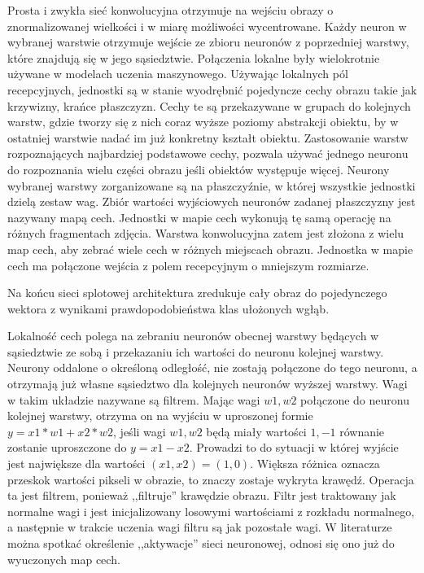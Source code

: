 \documentclass[12pt,a4paper,twoside,titlepage,openright]{book}
\begin{document}
Prosta i zwykła sieć konwolucyjna otrzymuje na wejściu obrazy o znormalizowanej wielkości i w miarę możliwości wycentrowane. Każdy neuron w wybranej warstwie otrzymuje wejście ze zbioru neuronów z poprzedniej warstwy, które znajdują się w jego sąsiedztwie. Połączenia lokalne były wielokrotnie używane w modelach uczenia maszynowego. Używając lokalnych pól recepcyjnych, jednostki są w stanie wyodrębnić pojedyncze cechy obrazu takie jak krzywizny, krańce płaszczyzn. Cechy te są przekazywane w grupach do kolejnych warstw, gdzie tworzy się z nich coraz wyższe poziomy abstrakcji obiektu, by w ostatniej warstwie nadać im już konkretny kształt obiektu. Zastosowanie warstw rozpoznających najbardziej podstawowe cechy, pozwala używać jednego neuronu do rozpoznania wielu części obrazu jeśli obiektów występuje więcej. Neurony wybranej warstwy zorganizowane są na płaszczyźnie, w której wszystkie jednostki dzielą zestaw wag. Zbiór wartości wyjściowych neuronów zadanej płaszczyzny jest nazywany mapą cech. Jednostki w mapie cech wykonują tę samą operację na różnych fragmentach zdjęcia. Warstwa konwolucyjna zatem jest złożona z wielu map cech, aby zebrać wiele cech w różnych miejscach obrazu. Jednostka w mapie cech ma połączone wejścia z polem recepcyjnym o mniejszym rozmiarze.

Na końcu sieci splotowej architektura zredukuje cały obraz do pojedynczego wektora z wynikami prawdopodobieństwa klas ułożonych wgłąb.

Lokalność cech polega na zebraniu neuronów obecnej warstwy będących w sąsiedztwie ze sobą i przekazaniu ich wartości do neuronu kolejnej warstwy. Neurony oddalone o określoną odległość, nie zostają połączone do tego neuronu, a otrzymają już własne sąsiedztwo dla kolejnych neuronów wyższej warstwy. Wagi w takim układzie nazywane są filtrem. Mając wagi \(w1, w2\) połączone do neuronu kolejnej warstwy, otrzyma on na wyjściu w uproszonej formie \(y = x1*w1 + x2*w2 \), jeśli wagi \(w1, w2\) będą miały wartości \(1, -1\) równanie zostanie uproszczone do  \(y = x1 - x2 \). Prowadzi to do sytuacji w której wyjście jest największe dla wartości \( (x1,x2) = (1,0)\). Większa różnica oznacza przeskok wartości pikseli w obrazie, to znaczy zostaje wykryta krawędź. Operacja ta jest filtrem, ponieważ ,,filtruje'' krawędzie obrazu. Filtr jest traktowany jak normalne wagi i jest inicjalizowany losowymi wartościami z rozkładu normalnego, a następnie w trakcie uczenia wagi filtru są jak pozostałe wagi. W literaturze można spotkać określenie ,,aktywacje'' sieci neuronowej, odnosi się ono już do wyuczonych map cech.
\end{document}
